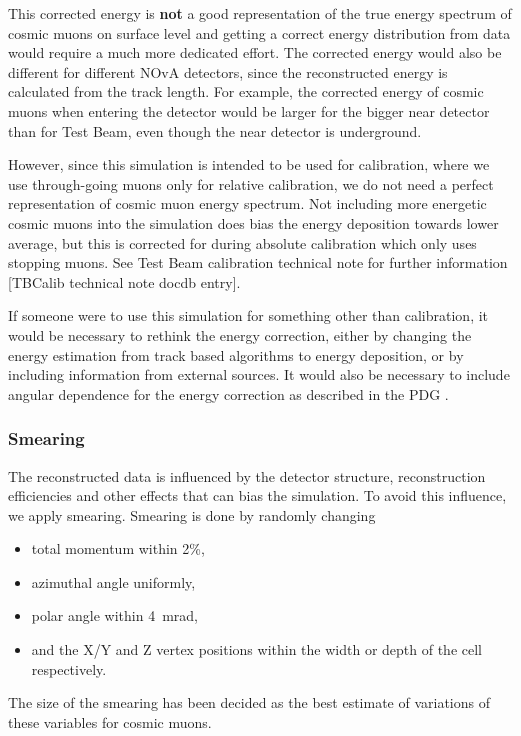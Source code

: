 \documentclass[12pt]{article}
\begin{document}
This corrected energy is \textbf{not} a good representation of the true energy spectrum of cosmic muons on surface level and getting a correct energy distribution from data would require a much more dedicated effort. The corrected energy would also be different for different NOvA detectors, since the reconstructed energy is calculated from the track length. For example, the corrected energy of cosmic muons when entering the detector would be larger for the bigger near detector than for Test Beam, even though the near detector is underground. 

However, since this simulation is intended to be used for calibration, where we use through-going muons only for relative calibration, we do not need a perfect representation of cosmic muon energy spectrum. Not including more energetic cosmic muons into the simulation does bias the energy deposition towards lower average, but this is corrected for during absolute calibration which only uses stopping muons. See Test Beam calibration technical note for further information [TBCalib technical note docdb entry].

If someone were to use this simulation for something other than calibration, it would be necessary to rethink the energy correction, either by changing the energy estimation from track based algorithms to energy deposition, or by including information from external sources. It would also be necessary to include angular dependence for the energy correction as described in the PDG \cite{rpp2022-rev-cosmic-rays.pdf}.

\subsubsection{Smearing}
The reconstructed data is influenced by the detector structure, reconstruction efficiencies and other effects that can bias the simulation. To avoid this influence, we apply smearing. Smearing is done by randomly changing
\begin{itemize}
\item total momentum within 2\%,
\item azimuthal angle uniformly,
\item polar angle within 4~mrad,
\item and the X/Y and Z vertex positions within the width or depth of the cell respectively.
\end{itemize}

The size of the smearing has been decided as the best estimate of variations of these variables for cosmic muons.
\end{document}
